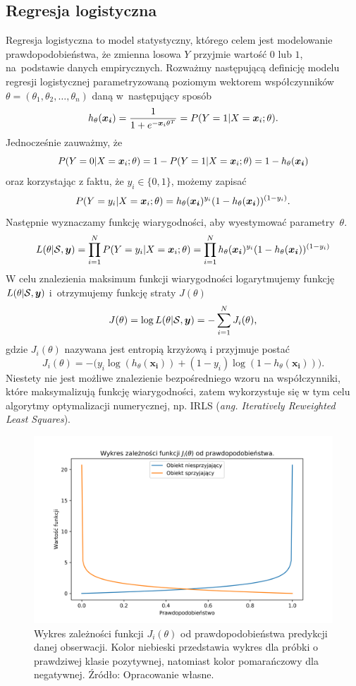 \documentclass[inzynierska]{pwr_wmat_praca_dyplomowa}
\theoremstyle{plain}
\numberwithin{theorem}{chapter}
\theoremstyle{definition}
\numberwithin{theorem}{chapter}
\begin{document}
\subsection{Regresja logistyczna}
\label{reg-log}
Regresja logistyczna to model statystyczny, którego celem jest modelowanie prawdopodobieństwa, że zmienna losowa $Y$ przyjmie wartość $0$ lub $1$, na~podstawie danych empirycznych. Rozważmy następującą definicję modelu regresji logistycznej parametryzowaną poziomym wektorem współczynników $\theta = (\theta_1, \theta_2, \dots, \theta_n)$ daną w~następujący sposób
\begin{equation}
	h_{\theta}(\boldsymbol{x_i}) = \frac{1}{1+e^{-\boldsymbol{x}_{i}\theta^T}} = P(Y = 1|X = \boldsymbol{x}_{i};\theta) \text{.}
\end{equation} 
Jednocześnie zauważmy, że
$$ P(Y = 0|X = \boldsymbol{x}_{i};\theta) = 1 - P(Y = 1|X = \boldsymbol{x}_{i};\theta) = 1 - h_{\theta}(\boldsymbol{x_i}) $$
oraz korzystając z faktu, że $y_i \in \{0,1\}$, możemy zapisać 
$$ P(Y = y_i|X = \boldsymbol{x}_{i};\theta) = h_{\theta}(\boldsymbol{x_i})^{y_i}(1-h_{\theta}(\boldsymbol{x_i}))^{(1-y_i)} \text{.}$$
Następnie wyznaczamy funkcję wiarygodności, aby wyestymować parametry~$\theta$.
$$ L(\theta | \mathcal{S}, \boldsymbol{y}) = \prod_{i=1}^N P(Y = y_i | X = \boldsymbol{x}_{i}; \theta) = \prod_{i=1}^N h_{\theta}(\boldsymbol{x_i})^{y_i}(1-h_{\theta}(\boldsymbol{x_i}))^{(1-y_i)}$$
W celu znalezienia maksimum funkcji wiarygodności logarytmujemy funkcję $L(\theta | \mathcal{S}, \boldsymbol{y})$ i~otrzymujemy funkcję straty $J(\theta)$
$$ J(\theta) = \log L(\theta | \mathcal{S}, \boldsymbol{y})  = -\sum_{i=1}^N J_i(\theta)\text{,}$$
gdzie $J_i(\theta)$ nazywana jest entropią krzyżową i przyjmuje postać
\begin{equation}
	\label{c-e}
	J_i(\theta) = -\big(y_i\log(h_{\theta}(\boldsymbol{x_i})) + (1-y_i)\log(1 - h_{\theta}(\boldsymbol{x_i}))\big) \text{.}
\end{equation}
Niestety nie jest możliwe znalezienie bezpośredniego wzoru na współczynniki, które maksymalizują funkcję wiarygodności, zatem wykorzystuje się w tym celu algorytmy optymalizacji numerycznej, np. IRLS (\textit{ang. Iteratively Reweighted Least Squares}).

\begin{figure}[h]
	\includegraphics[width=\linewidth]{images/cross_entropy.png}
	\caption{Wykres zależności funkcji $J_i(\theta)$ od prawdopodobieństwa predykcji danej obserwacji. Kolor niebieski przedstawia wykres dla próbki o prawdziwej klasie pozytywnej, natomiast kolor pomarańczowy dla negatywnej. Źródło: Opracowanie własne.}
	\label{fig:cross-entropy-plot}
\end{figure}
\end{document}
